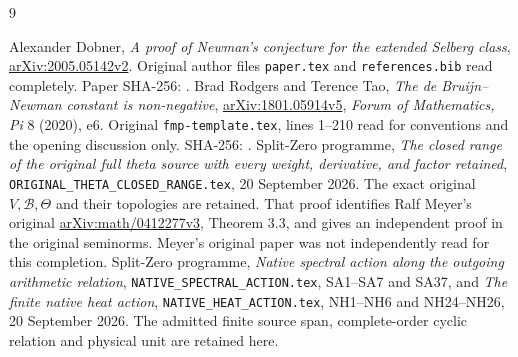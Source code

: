 \documentclass[11pt]{article}
\newcommand{\B}{\mathscr B}\newcommand{\Epi}{\mathscr E_\pi}
\begin{document}
\begin{thebibliography}{9}\raggedright
{} Alexander Dobner,
\emph{A proof of Newman's conjecture for the extended Selberg class},
\href{https://arxiv.org/abs/2005.05142v2}{arXiv:2005.05142v2}.
Original author files \texttt{paper.tex} and \texttt{references.bib}
read completely. Paper SHA-256:
.
 Brad Rodgers and Terence Tao,
\emph{The de Bruijn--Newman constant is non-negative},
\href{https://arxiv.org/abs/1801.05914v5}{arXiv:1801.05914v5},
\emph{Forum of Mathematics, Pi} 8 (2020), e6.
Original \texttt{fmp-template.tex}, lines 1--210 read for conventions
and the opening discussion only. SHA-256:
.
 Split-Zero programme,
\emph{The closed range of the original full theta source with every
weight, derivative, and factor retained},
\texttt{ORIGINAL\_THETA\_CLOSED\_RANGE.tex}, 20 September 2026.
The exact original $V,\B,\Theta$ and their topologies are retained.
That proof identifies Ralf Meyer's original
\href{https://arxiv.org/abs/math/0412277v3}{arXiv:math/0412277v3},
Theorem 3.3, and gives an independent proof in the original seminorms.
Meyer's original paper was not independently read for this completion.
 Split-Zero programme,
\emph{Native spectral action along the outgoing arithmetic relation},
\texttt{NATIVE\_SPECTRAL\_ACTION.tex}, SA1--SA7 and SA37, and
\emph{The finite native heat action},
\texttt{NATIVE\_HEAT\_ACTION.tex}, NH1--NH6 and NH24--NH26,
20 September 2026. The admitted finite source span, complete-order
cyclic relation and physical unit are retained here.
\end{thebibliography}
\end{document}
